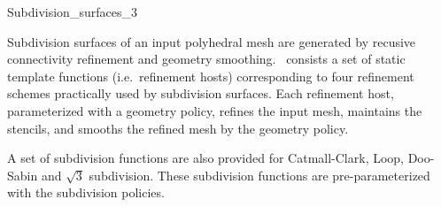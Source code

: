 
\ccRefPageBegin



\begin{ccRefClass}{Subdivision_surfaces_3}

\ccDefinition

Subdivision surfaces of an input polyhedral mesh
are generated by recusive connectivity refinement and geometry
smoothing. \ccClassTemplateName\ consists a set of static 
template functions (i.e.~refinement hosts) corresponding 
to four refinement schemes practically used by subdivision surfaces. 
Each refinement host, parameterized with a geometry policy,
refines the input mesh, maintains the stencils, and smooths the 
refined mesh by the geometry policy.

A set of subdivision functions are also provided  
for Catmall-Clark, Loop, Doo-Sabin and $\sqrt{3}$ subdivision.
These subdivision functions are pre-parameterized with the
subdivision policies.




\ccParameters


\end{ccRefClass}
